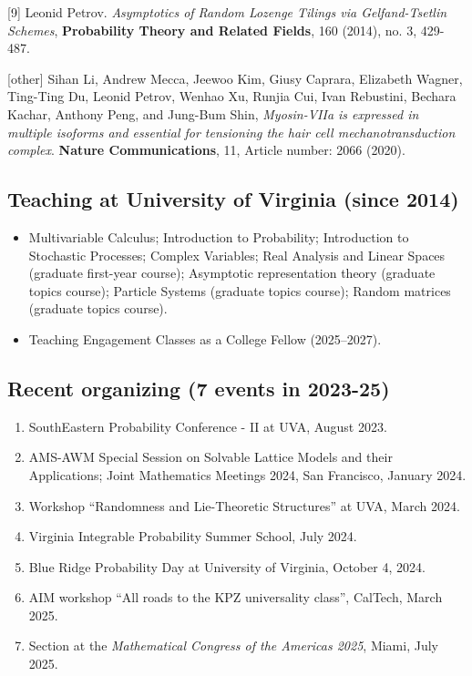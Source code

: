\documentclass[letterpaper,11pt]{article}
\begin{document}
\begin{etaremune}
		
		
		
		\item[{[9]}] 
		Leonid Petrov.
		\emph{Asymptotics of Random Lozenge Tilings via Gelfand-Tsetlin Schemes}, \textbf{Probability Theory and Related Fields}, 160 (2014), no. 3, 429-487. 

	
			\item[{[other]}]
			Sihan Li, Andrew Mecca, Jeewoo Kim, Giusy Caprara, Elizabeth Wagner, Ting-Ting Du, Leonid Petrov, Wenhao Xu, Runjia Cui, Ivan Rebustini, Bechara Kachar, Anthony Peng, and Jung-Bum Shin,
	\emph{Myosin-VIIa is expressed in multiple isoforms and essential for tensioning the hair cell mechanotransduction complex}.
	\textbf{Nature Communications}, 11, Article number: 2066 (2020).
		\end{etaremune}



\subsection*{Teaching at University of Virginia (since 2014)}

\begin{itemize}
	\item 
 Multivariable Calculus;
Introduction to Probability; 
Introduction to Stochastic Processes;
Complex Variables;
Real Analysis and Linear Spaces (graduate first-year course);
Asymptotic representation theory (graduate topics course);
Particle Systems (graduate topics course);
Random matrices (graduate topics course).


 \item 
 Teaching Engagement Classes as a College Fellow (2025--2027).
\end{itemize}
		

		\subsection*{Recent organizing (7 events in 2023-25)}

\begin{enumerate}
	\item SouthEastern Probability Conference - II at UVA, August  2023.
	\item AMS-AWM Special Session on Solvable Lattice Models and their Applications; Joint Mathematics Meetings 2024, San Francisco, January 2024.
	\item Workshop ``Randomness and Lie-Theoretic Structures'' at UVA, March 2024.
	\item Virginia Integrable Probability Summer School, July 2024.
	\item Blue Ridge Probability Day at University of Virginia, October 4, 2024.
	\item AIM workshop ``All roads to the KPZ universality class'', CalTech, March 2025.
	\item Section at the \textit{Mathematical Congress of the Americas 2025}, Miami, July 2025.
\end{enumerate}
\end{document}
